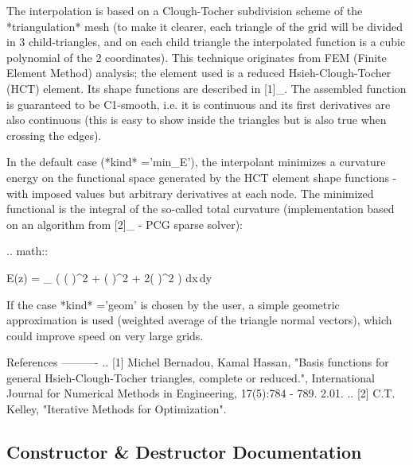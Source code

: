 \begin{DoxyVerb}
The interpolation is based on a Clough-Tocher subdivision scheme of
the *triangulation* mesh (to make it clearer, each triangle of the
grid will be divided in 3 child-triangles, and on each child triangle
the interpolated function is a cubic polynomial of the 2 coordinates).
This technique originates from FEM (Finite Element Method) analysis;
the element used is a reduced Hsieh-Clough-Tocher (HCT)
element. Its shape functions are described in [1]_.
The assembled function is guaranteed to be C1-smooth, i.e. it is
continuous and its first derivatives are also continuous (this
is easy to show inside the triangles but is also true when crossing the
edges).

In the default case (*kind* ='min_E'), the interpolant minimizes a
curvature energy on the functional space generated by the HCT element
shape functions - with imposed values but arbitrary derivatives at each
node. The minimized functional is the integral of the so-called total
curvature (implementation based on an algorithm from [2]_ - PCG sparse
solver):

    .. math::

        E(z) =  \int_{\Omega} \left(
            \left(  \right)^2 +
            \left(  \right)^2 +
            2\left(  \right)^2
        \right) dx\,dy

If the case *kind* ='geom' is chosen by the user, a simple geometric
approximation is used (weighted average of the triangle normal
vectors), which could improve speed on very large grids.

References
----------
.. [1] Michel Bernadou, Kamal Hassan, "Basis functions for general
    Hsieh-Clough-Tocher triangles, complete or reduced.",
    International Journal for Numerical Methods in Engineering,
    17(5):784 - 789. 2.01.
.. [2] C.T. Kelley, "Iterative Methods for Optimization".\end{DoxyVerb}
 

\subsection{Constructor \& Destructor Documentation}
\mbox{\label{classmatplotlib_1_1tri_1_1triinterpolate_1_1CubicTriInterpolator_a0c3d78be256683e57f25356c1fc7fc5f}} 
